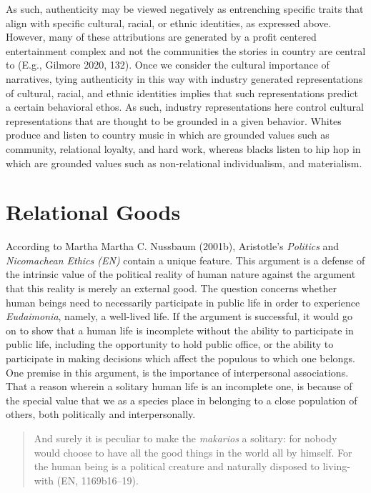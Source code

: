 \documentclass[12pt]{book}
\theoremstyle{definition}
\theoremstyle{remark}
\begin{document}
As such, authenticity may be viewed negatively as entrenching specific traits that align with specific cultural, racial, or ethnic identities, as expressed above. However, many of these attributions are generated by a profit centered entertainment complex and not the communities the stories in country are central to (E.g., Gilmore 2020, 132). Once we consider the cultural importance of narratives, tying authenticity in this way with industry generated representations of cultural, racial, and ethnic identities implies that such representations predict a certain behavioral ethos. As such, industry representations here control cultural representations that are thought to be grounded in a given behavior. Whites produce and listen to country music in which are grounded values such as community, relational loyalty, and hard work, whereas blacks listen to hip hop in which are grounded values such as non-relational individualism, and materialism.

\section{Relational Goods}\label{relational-goods}

According to Martha Martha C. Nussbaum (2001b), Aristotle's \emph{Politics} and \emph{Nicomachean Ethics (EN)} contain a unique feature. This argument is a defense of the intrinsic value of the political reality of human nature against the argument that this reality is merely an external good. The question concerns whether human beings need to necessarily participate in public life in order to experience \emph{Eudaimonia}, namely, a well-lived life. If the argument is successful, it would go on to show that a human life is incomplete without the ability to participate in public life, including the opportunity to hold public office, or the ability to participate in making decisions which affect the populous to which one belongs. One premise in this argument, is the importance of interpersonal associations. That a reason wherein a solitary human life is an incomplete one, is because of the special value that we as a species place in belonging to a close population of others, both politically and interpersonally.

\begin{quote}
And surely it is peculiar to make the \emph{makarios} a solitary: for nobody would choose to have all the good things in the world all by himself. For the human being is a political creature and naturally disposed to living-with (EN, 1169b16--19).
\end{quote}
\end{document}
